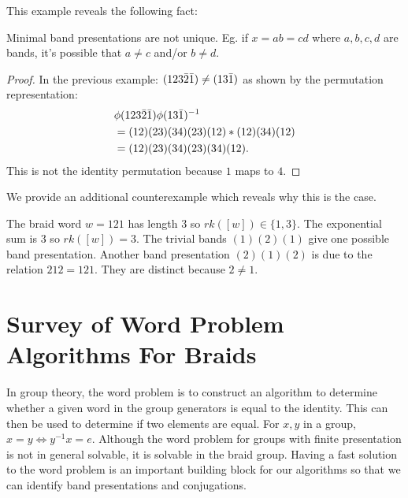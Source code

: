 \documentclass[12pt]{thesis}
\begin{document}
This example reveals the following fact:

\begin{proposition}
    Minimal band presentations are not unique.
    Eg. if $x = ab = cd$  where $a, b, c, d$ are bands,
    it's possible that $a \neq c$ and/or $b \neq d$.
\end{proposition}

\begin{proof}
    In the previous example:
    $(1 2 3 \bar{2} \bar{1}) \neq (1 3 \bar{1})$ 
    as shown by the permutation representation:
    \[
        \begin{split}
        &\phi(1 2 3 \bar{2} \bar{1}) \phi( 1 3 \bar{1})^{-1} \\
        &=(12)(23)(34)(23)(12) * (12)(34)(12) \\
        &= (12) (23) (34) (23) (34) (12).
        \end{split}
    \]
    This is not the identity permutation because $1$ maps to $4$.
\end{proof}

We provide an additional counterexample which reveals why this is the case.
\begin{example}
    The braid word $w = 1 2 1$ has length 3 so $rk([w]) \in \{ 1, 3 \}$.
    The exponential sum is $3$ so $rk([w]) = 3$.
    The trivial bands $(1)(2)(1)$ give one possible band presentation.
    Another band presentation $(2)(1)(2)$ is due to the 
    relation $212 = 121$.
    They are distinct because $2 \neq 1$.
\end{example}

\chapter{Survey of Word Problem Algorithms For Braids}

\label{chap:word-problem}

In group theory, the word problem is
to construct an algorithm to determine whether a given word
in the group generators is equal
to the identity.
This can then be used to determine if two elements are equal.
For $x, y$ in a group, $x = y \Leftrightarrow y^{-1}x = e$.
Although the word problem for groups with finite presentation is not in general solvable,
it is solvable in the braid group.
Having a fast solution to the word problem is an important building block for our algorithms
so that we can identify band presentations
and conjugations.
\end{document}
